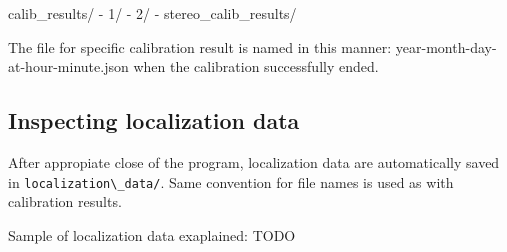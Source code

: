 \begin{code}
calib\_results/
 - 1/
 - 2/
 - stereo\_calib\_results/
\end{code} 	

The file for specific calibration result is named in this manner:
{year}-{month}-{day}-at-{hour}-{minute}.json when the calibration successfully
ended.

\subsection {Inspecting localization data}
After appropiate close of the program, localization data are automatically
saved in \verb+localization\_data/+. Same convention for file names is used as
with calibration results.

Sample of localization data exaplained:
TODO
